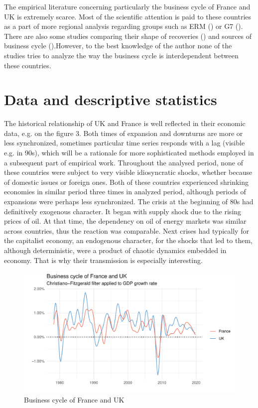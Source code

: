 \documentclass{article}
\begin{document}
The empirical literature concerning particularly the business cycle of France and UK is extremely scarce. Most of the scientific attention is paid to these countries as a part of more regional analysis regarding groups such as ERM (\cite{artis}) or G7 (\cite{fiorito}). There are also some studies comparing their shape of recoveries (\cite{bec}) and sources of business cycle (\cite{karras}).However, to the best knowledge of the author none of the studies tries to analyze the way the business cycle is interdependent between these countries.

\section*{Data and descriptive statistics}


The historical relationship of UK and France is well reflected in their economic data, e.g. on the figure 3. Both times of expansion and downturns are more or less synchronized, sometimes particular time series responds with a lag (visible e.g. in 90s), which will be a rationale for more sophisticated methods employed in a subsequent part of empirical work. Throughout the analysed period, none of these countries were subject to very visible idiosyncratic shocks, whether because of domestic issues or foreign ones. Both of these countries experienced shrinking economies in similar period three times in analyzed period, although periods of expansions were perhaps less synchronized. The crisis at the beginning of 80s had definitively exogenous character. It began with supply shock due to the rising prices of oil. At that time, the dependency on oil of energy markets was similar across countries, thus the reaction was comparable. Next crises had typically for the capitalist economy, an endogenous character, for the shocks that led to them, although deterministic, were a product of chaotic dynamics embedded in economy. That is why their transmission is especially interesting.

\begin{figure}[ht]
\centering
\includegraphics[scale=0.8]{graphs/filtered_cycle.pdf}
\caption{Business cycle of France and UK}
\end{figure}
    
\end{document}

